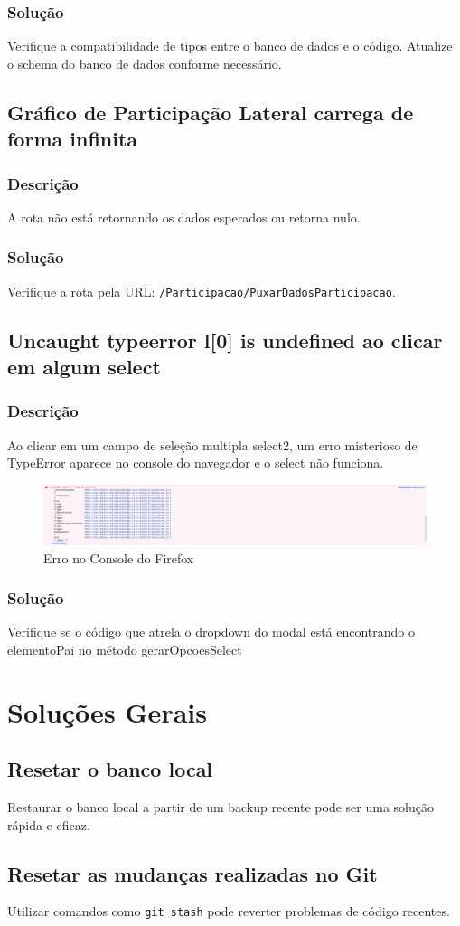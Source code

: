 \documentclass[12pt]{article}
\begin{document}
\subsubsection{Solução}
Verifique a compatibilidade de tipos entre o banco de dados e o código. Atualize o schema do banco de dados conforme necessário.

\subsection{Gráfico de Participação Lateral carrega de forma infinita}
\subsubsection{Descrição}
A rota não está retornando os dados esperados ou retorna nulo.

\subsubsection{Solução}
Verifique a rota pela URL: \texttt{/Participacao/PuxarDadosParticipacao}.

\subsection{Uncaught typeerror l[0] is undefined ao clicar em algum select}

\subsubsection{Descrição}
Ao clicar em um campo de seleção multipla select2, um erro misterioso de TypeError aparece no console do navegador e o select não funciona.

\begin{figure}[h!]
    \includegraphics[width=\linewidth]{Imagens/typeerrorselect.png}
    \caption{Erro no Console do Firefox}
\end{figure}

\subsubsection{Solução}
Verifique se o código que atrela o dropdown do modal está encontrando o elementoPai no método gerarOpcoesSelect

\section{Soluções Gerais}
\subsection{Resetar o banco local}
Restaurar o banco local a partir de um backup recente pode ser uma solução rápida e eficaz.

\subsection{Resetar as mudanças realizadas no Git}
Utilizar comandos como \texttt{git stash} pode reverter problemas de código recentes.
\end{document}
